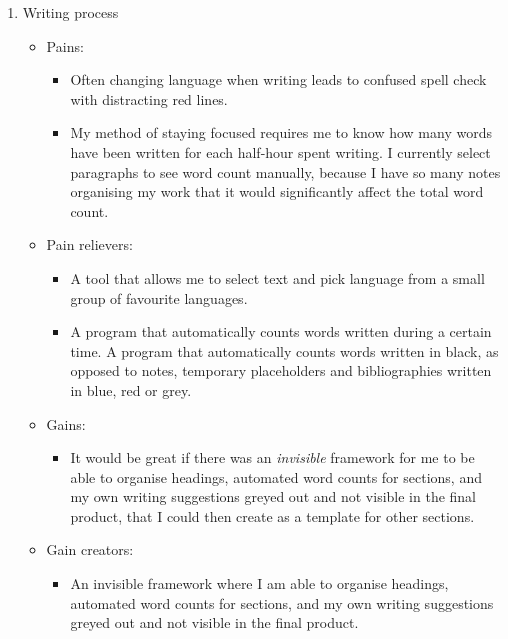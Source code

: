 \documentclass[12pt]{article}
\begin{document}
\begin{enumerate}
    \item Writing process
    \begin{itemize}
        \renewcommand{\labelitemi}{$\clock$}
        \renewcommand{\labelitemii}{$\cdot$}
        \item Pains:
        \begin{itemize}
            \item Often changing language when writing leads to confused spell check with distracting red lines. 
            \item My method of staying focused requires me to know how many words have been written for each half-hour spent writing. I currently select paragraphs to see word count manually, because I have so many notes organising my work that it would significantly affect the total word count.
        \end{itemize}
        \renewcommand{\labelitemi}{$\sun$}
        \item Pain relievers:
        \begin{itemize}
            \item A tool that allows me to select text and pick language from a small group of favourite languages.
            \item A program that automatically counts words written during a certain time. A program that automatically counts words written in black, as opposed to notes, temporary placeholders and bibliographies written in blue, red or grey. 
        \end{itemize}
        \renewcommand{\labelitemi}{$\smiley$}    
        \item Gains:
        \begin{itemize}
            \item It would be great if there was an \emph{invisible} framework for me to be able to organise headings, automated word counts for sections, and my own writing suggestions greyed out and not visible in the final product, that I could then create as a template for other sections.
        \end{itemize}
        \renewcommand{\labelitemi}{$\blacksmiley$}
        \item Gain creators:
        \begin{itemize}
            \item An invisible framework where I am able to organise headings, automated word counts for sections, and my own writing suggestions greyed out and not visible in the final product.
        \end{itemize}
    \end{itemize}
    

\end{enumerate}
\end{document}
